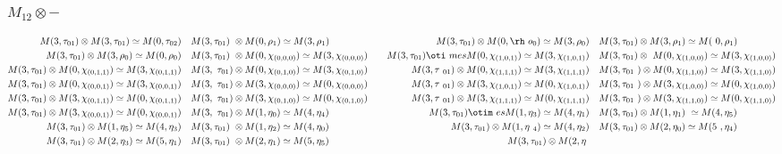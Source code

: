 \subsubsection{$M_12\otimes -$}
\begin{align*}
M(3,\tau_{01}) \otimes M(3,\tau_{01}) \simeq M(0,\tau_{02}) &&& M(3,\tau_{01})\
 \otimes M(0,\rho_{1}) \simeq M(3,\rho_{1}) &&& M(3,\tau_{01}) \otimes M(0,\rh\
o_{0}) \simeq M(3,\rho_{0}) &&& M(3,\tau_{01}) \otimes M(3,\rho_{1}) \simeq M(\
0,\rho_{1})\\
M(3,\tau_{01}) \otimes M(3,\rho_{0}) \simeq M(0,\rho_{0}) &&& M(3,\tau_{01}) \
\otimes M(0,\chi_{(0,0,0)}) \simeq M(3,\chi_{(0,0,0)}) &&& M(3,\tau_{01}) \oti\
mes M(0,\chi_{(1,0,1)}) \simeq M(3,\chi_{(1,0,1)}) &&& M(3,\tau_{01}) \otimes \
M(0,\chi_{(1,0,0)}) \simeq M(3,\chi_{(1,0,0)})\\
M(3,\tau_{01}) \otimes M(0,\chi_{(0,1,1)}) \simeq M(3,\chi_{(0,1,1)}) &&& M(3,\
\tau_{01}) \otimes M(0,\chi_{(0,1,0)}) \simeq M(3,\chi_{(0,1,0)}) &&& M(3,\tau\
_{01}) \otimes M(0,\chi_{(1,1,1)}) \simeq M(3,\chi_{(1,1,1)}) &&& M(3,\tau_{01\
}) \otimes M(0,\chi_{(1,1,0)}) \simeq M(3,\chi_{(1,1,0)})\\
M(3,\tau_{01}) \otimes M(0,\chi_{(0,0,1)}) \simeq M(3,\chi_{(0,0,1)}) &&& M(3,\
\tau_{01}) \otimes M(3,\chi_{(0,0,0)}) \simeq M(0,\chi_{(0,0,0)}) &&& M(3,\tau\
_{01}) \otimes M(3,\chi_{(1,0,1)}) \simeq M(0,\chi_{(1,0,1)}) &&& M(3,\tau_{01\
}) \otimes M(3,\chi_{(1,0,0)}) \simeq M(0,\chi_{(1,0,0)})\\
M(3,\tau_{01}) \otimes M(3,\chi_{(0,1,1)}) \simeq M(0,\chi_{(0,1,1)}) &&& M(3,\
\tau_{01}) \otimes M(3,\chi_{(0,1,0)}) \simeq M(0,\chi_{(0,1,0)}) &&& M(3,\tau\
_{01}) \otimes M(3,\chi_{(1,1,1)}) \simeq M(0,\chi_{(1,1,1)}) &&& M(3,\tau_{01\
}) \otimes M(3,\chi_{(1,1,0)}) \simeq M(0,\chi_{(1,1,0)})\\
M(3,\tau_{01}) \otimes M(3,\chi_{(0,0,1)}) \simeq M(0,\chi_{(0,0,1)}) &&& M(3,\
\tau_{01}) \otimes M(1,\eta_{0}) \simeq M(4,\eta_{4}) &&& M(3,\tau_{01}) \otim\
es M(1,\eta_{3}) \simeq M(4,\eta_{1}) &&& M(3,\tau_{01}) \otimes M(1,\eta_{1})\
 \simeq M(4,\eta_{5})\\
M(3,\tau_{01}) \otimes M(1,\eta_{5}) \simeq M(4,\eta_{3}) &&& M(3,\tau_{01}) \
\otimes M(1,\eta_{2}) \simeq M(4,\eta_{0}) &&& M(3,\tau_{01}) \otimes M(1,\eta\
_{4}) \simeq M(4,\eta_{2}) &&& M(3,\tau_{01}) \otimes M(2,\eta_{0}) \simeq M(5\
,\eta_{4})\\
M(3,\tau_{01}) \otimes M(2,\eta_{3}) \simeq M(5,\eta_{1}) &&& M(3,\tau_{01}) \
\otimes M(2,\eta_{1}) \simeq M(5,\eta_{5}) &&& M(3,\tau_{01}) \otimes M(2,\eta\

\end{align*}
